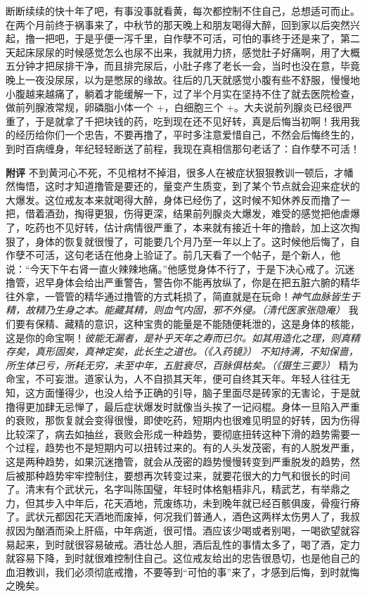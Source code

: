 \begin{case}
    断断续续的快十年了吧，有事没事就看黄，每次都控制不住自己，总想适可而止。在两个月前终于祸事来了，中秋节的那天晚上和朋友喝得大醉，回到家以后突然兴起，撸一把吧，于是乎便一泻千里，自作孽不可活，可怕的事终于还是来了，第二天起床尿尿的时候感觉怎么也尿不出来，我就用力挤，感觉肚子好痛啊，用了大概五分钟才把尿排干净，而且排完尿后，小肚子疼了老长一会，当时也没在意，毕竟晚上一夜没尿尿，以为是憋尿的缘故。往后的几天就感觉小腹有些不舒服，慢慢地小腹越来越痛了，躺着才能缓解一下，过了半个月实在坚持不住了就去医院检查，做前列腺液常规，卵磷脂小体一个 +，白细胞三个 +。大夫说前列腺炎已经很严重了，于是就拿了千把块钱的药，吃到现在还不见好转，真是后悔当初啊！我用我的经历给你们一个忠告，不要再撸了，平时多注意爱惜自己，不然会后悔终生的，到时百病缠身，年纪轻轻断送了前程，我现在真相信那句老话了：自作孽不可活！

    \textbf{附评} 不到黄河心不死，不见棺材不掉泪，很多人在被症状狠狠教训一顿后，才幡然悔悟，这时才知道撸管是要还的，量变产生质变，到了某个节点就会迎来症状的大爆发。这位戒友本来就喝得大醉，身体已经伤了，这时候不知休养反而撸了一把，借着酒劲，掏得更狠，伤得更深，结果前列腺炎大爆发，难受的感觉把他虐爆了，吃药也不见好转，估计病情很严重了，本来就有接近十年的撸龄，加上这次掏狠了，身体的恢复就很慢了，可能要几个月乃至一年以上了。这时候他后悔了，自作孽不可活，这句老话在他身上验证了。前几天看了一个帖子，是个新人，他说：“今天下午右肾一直火辣辣地痛。”他感觉身体不行了，于是下决心戒了。沉迷撸管，迟早身体会给出严重警告，警告你不能再放纵了，你是在把五脏六腑的精华往外拿，一管管的精华通过撸管的方式耗损了，简直就是在玩命！\textit{神气血脉皆生于精，故精乃生身之本。能藏其精，则血气内固，邪不外侵。（清代医家张隐庵）} 我们要有保精、藏精的意识，这种宝贵的能量是不能随便耗泄的，这是身体的核能，这是你的命宝啊！\textit{彼能无漏者，是补乎天年之寿而已尔。如其用造化之理，则真精存矣，真形固矣，真神定矣，此长生之道也。（《入药镜》）} \textit{不知持满，不知保啬，所生体已亏，所耗无穷，未至中年，五脏衰尽，百脉俱枯矣。（《摄生三要》）} 精为命宝，不可妄泄。道家认为，人不自损其天年，便可自终其天年。年轻人往往无知，这方面懂得少，也没人给予正确的引导，脑子里面尽是砖家的无害论，于是就撸得更加肆无忌惮了，最后症状爆发时就像当头挨了一记闷棍。身体一旦陷入严重的衰败，那恢复就会变得很慢，即使吃药，短期内也很难见明显的好转，因为伤得比较深了，病去如抽丝，衰败会形成一种趋势，要彻底扭转这种下滑的趋势需要一个过程，趋势也不是短期内可以扭转过来的。有的人头发茂密，有的人脱发严重，这是两种趋势，如果沉迷撸管，就会从茂密的趋势慢慢转变到严重脱发的趋势，然后被那种趋势牢牢控制住，要想再次转变过来，就要花很大的力气和很长的时间了。清末有个武状元，名字叫陈国璧，年轻时体格魁梧非凡，精武艺，有举鼎之力，但其步入中年后，花天酒地，荒废练功，未到晚年就已经百骸俱废，骨瘦行瘠了。武状元都因花天酒地而废掉，何况我们普通人，酒色这两样太伤男人了，我叔叔因为酗酒而染上肝癌，中年病逝，很可惜。酒应该少喝或者别喝，一喝欲望就容易起来，到时就很容易破戒。酒壮怂人胆，酒后乱性的事情太多了，喝了酒，定力就容易下降，到时就很难控制住自己。这位戒友给出的忠告很恳切，也是他自己的血泪教训，我们必须彻底戒撸，不要等到“可怕的事”来了，才感到后悔，到时就悔之晚矣。
\end{case}

